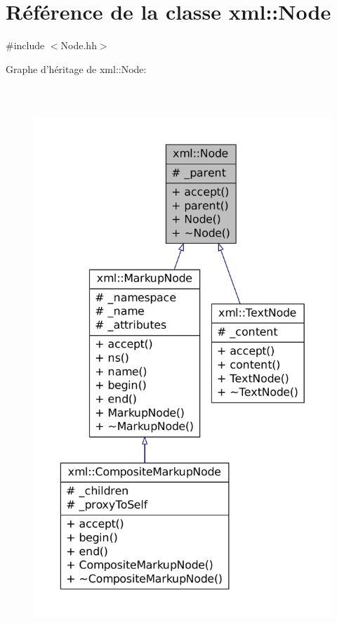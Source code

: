 \hypertarget{classxml_1_1_node}{
\section{Référence de la classe xml::Node}
\label{classxml_1_1_node}
}


{\ttfamily \#include $<$Node.hh$>$}



Graphe d'héritage de xml::Node:\nopagebreak
\begin{figure}[H]
\begin{center}
\leavevmode
\includegraphics[height=600pt]{classxml_1_1_node__inherit__graph}
\end{center}
\end{figure}


